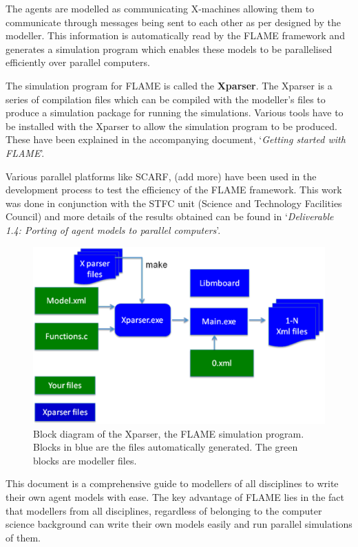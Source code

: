 \documentclass[12pt,a4paper]{article}
\begin{document}
The agents are modelled as communicating X-machines allowing them to
communicate through messages being sent to each other as per
designed by the modeller. This information is automatically read by
the FLAME framework and generates a simulation program which enables
these models to be parallelised efficiently over parallel computers.

The simulation program for FLAME is called the \textbf{Xparser}. The
Xparser is a series of compilation files which can be compiled with
the modeller's files to produce a simulation package for running
the simulations. Various tools have to be installed with the Xparser
to allow the simulation program to be produced. These have been
explained in the accompanying document, `\emph{Getting started with
FLAME}'.

Various parallel platforms like SCARF, (add more) have been used in
the development process to test the efficiency of the FLAME
framework. This work was done in conjunction with the STFC unit (Science and Technology Facilities Council) and more
details of the results obtained can be found in `\emph{Deliverable
1.4: Porting of agent models to parallel computers}'.



\begin{figure}[!htb]
\begin{center}
  \includegraphics*[scale=0.35]{xparserdiag.eps}
  \caption{Block diagram of the Xparser, the FLAME simulation program. Blocks in blue are the files automatically generated. The green blocks are modeller files.}
  \label{fig:xparserdiag}
  \end{center}
\end{figure}

This document is a comprehensive guide to modellers of all
disciplines to write their own agent models with ease. The key
advantage of FLAME lies in the fact that modellers from all
disciplines, regardless of belonging to the computer science
background can write their own models easily and run parallel simulations of them.
\end{document}
